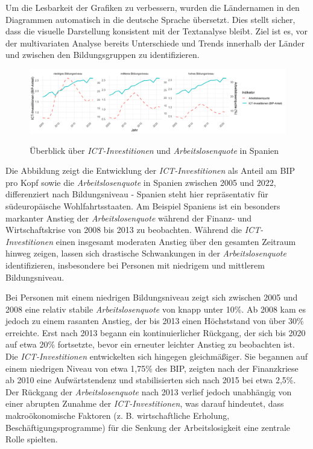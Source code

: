 Um die Lesbarkeit der Grafiken zu verbessern, wurden die Ländernamen in den Diagrammen 
automatisch in die deutsche Sprache übersetzt. Dies stellt sicher, dass die visuelle Darstellung 
konsistent mit der Textanalyse bleibt. Ziel ist es, vor der multivariaten Analyse bereits 
Unterschiede und Trends innerhalb der Länder und zwischen den Bildungsgruppen zu identifizieren.

\begin{figure}[htbp]
    \centering
    \caption{Überblick über \textit{\ac{ICT}-Investitionen} und \textit{Arbeitslosenquote} in 
    Spanien}
    \includegraphics[width=\textwidth]{assets/plot_spain_final.png}
    \label{fig:spain}
\end{figure}

Die Abbildung zeigt die Entwicklung der \textit{\ac{ICT}-Investitionen} als Anteil am \ac{BIP} 
pro Kopf sowie die \textit{Arbeitslosenquote} in Spanien zwischen 2005 und 2022, differenziert 
nach Bildungsniveau - Spanien steht hier repräsentativ für südeuropäische Wohlfahrtsstaaten. Am 
Beispiel Spaniens ist ein besonders markanter Anstieg der \textit{Arbeitslosenquote} während der 
Finanz- und Wirtschaftskrise von 2008 bis 2013 zu beobachten. Während die 
\textit{\ac{ICT}-Investitionen} einen insgesamt moderaten Anstieg über den gesamten Zeitraum 
hinweg zeigen, lassen sich drastische Schwankungen in der \textit{Arbeitslosenquote} 
identifizieren, insbesondere bei Personen mit niedrigem und mittlerem Bildungsniveau.

Bei Personen mit einem niedrigen Bildungsniveau zeigt sich zwischen 2005 und 2008 eine relativ 
stabile \textit{Arbeitslosenquote} von knapp unter 10\%. Ab 2008 kam es jedoch zu einem rasanten 
Anstieg, der bis 2013 einen Höchststand von über 30\% erreichte. Erst nach 2013 begann ein 
kontinuierlicher Rückgang, der sich bis 2020 auf etwa 20\% fortsetzte, bevor ein erneuter 
leichter Anstieg zu beobachten ist. Die \textit{\ac{ICT}-Investitionen} entwickelten sich 
hingegen gleichmäßiger. Sie begannen auf einem niedrigen Niveau von etwa 1,75\% des BIP, zeigten 
nach der Finanzkriese ab 2010 eine Aufwärtstendenz und stabilisierten sich nach 2015 bei etwa 
2,5\%. Der Rückgang der \textit{Arbeitslosenquote} nach 2013 verlief jedoch unabhängig von einer 
abrupten Zunahme der \textit{\ac{ICT}-Investitionen}, was darauf hindeutet, dass makroökonomische 
Faktoren (z. B. wirtschaftliche Erholung, Beschäftigungsprogramme) für die Senkung der 
Arbeitslosigkeit eine zentrale Rolle spielten.

